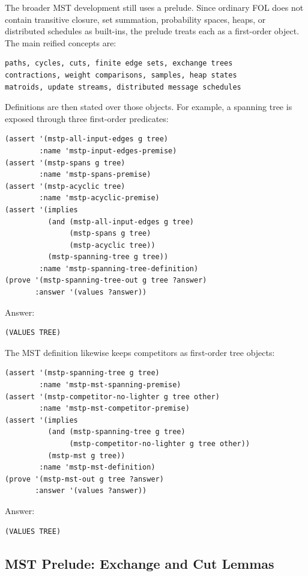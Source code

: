 \documentclass[runningheads]{llncs}
\begin{document}
The broader MST development still uses a prelude.  Since ordinary FOL does not
contain transitive closure, set summation, probability spaces, heaps, or
distributed schedules as built-ins, the prelude treats each as a first-order
object.  The main reified concepts are:
\begin{lstlisting}
paths, cycles, cuts, finite edge sets, exchange trees
contractions, weight comparisons, samples, heap states
matroids, update streams, distributed message schedules
\end{lstlisting}
Definitions are then stated over those objects.  For example, a spanning tree
is exposed through three first-order predicates:
\begin{lstlisting}
(assert '(mstp-all-input-edges g tree)
        :name 'mstp-input-edges-premise)
(assert '(mstp-spans g tree)
        :name 'mstp-spans-premise)
(assert '(mstp-acyclic tree)
        :name 'mstp-acyclic-premise)
(assert '(implies
          (and (mstp-all-input-edges g tree)
               (mstp-spans g tree)
               (mstp-acyclic tree))
          (mstp-spanning-tree g tree))
        :name 'mstp-spanning-tree-definition)
(prove '(mstp-spanning-tree-out g tree ?answer)
       :answer '(values ?answer))
\end{lstlisting}
Answer:
\begin{lstlisting}
(VALUES TREE)
\end{lstlisting}

The MST definition likewise keeps competitors as first-order tree objects:
\begin{lstlisting}
(assert '(mstp-spanning-tree g tree)
        :name 'mstp-mst-spanning-premise)
(assert '(mstp-competitor-no-lighter g tree other)
        :name 'mstp-mst-competitor-premise)
(assert '(implies
          (and (mstp-spanning-tree g tree)
               (mstp-competitor-no-lighter g tree other))
          (mstp-mst g tree))
        :name 'mstp-mst-definition)
(prove '(mstp-mst-out g tree ?answer)
       :answer '(values ?answer))
\end{lstlisting}
Answer:
\begin{lstlisting}
(VALUES TREE)
\end{lstlisting}

\subsection{MST Prelude: Exchange and Cut Lemmas}
\end{document}

